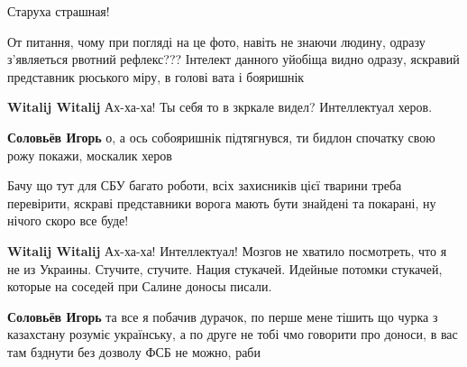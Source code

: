 \begin{itemize}

Старуха страшная!



От питання, чому при погляді на це фото, навіть не знаючи людину, одразу
з'являеться рвотний рефлекс??? Інтелект данного уйобіща видно одразу, яскравий
представник рюського міру, в голові вата і бояришнік🤣🤣🤣

\begin{itemize}
\textbf{Witalij Witalij} Ах-ха-ха! Ты себя то в зкркале видел? Интеллектуал херов.


\textbf{Соловьёв Игорь} о, а ось собояришнік підтягнувся, ти бидлон спочатку свою рожу покажи, москалик херов🤣🤣🤣🤣🤣


Бачу що тут для СБУ багато роботи, всіх захисників цієї тварини треба перевірити, яскраві представники ворога мають бути знайдені та покарані, ну нічого скоро все буде!


\textbf{Witalij Witalij} Ах-ха-ха! Интеллектуал! Мозгов не хватило посмотреть, что я не из Украины. Стучите, стучите. Нация стукачей. Идейные потомки стукачей, которые на соседей при Салине доносы писали.


\textbf{Соловьёв Игорь} та все я побачив дурачок, по перше мене тішить що чурка з казахстану розуміє українську, а по друге не тобі чмо говорити про доноси, в вас там бзднути без дозволу ФСБ не можно, раби🤣🤣🤣🤣



\end{itemize}
\end{itemize}
